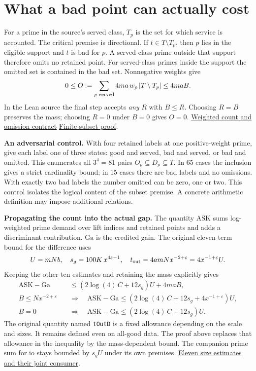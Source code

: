 \documentclass[12pt,letterpaper]{article}
\newcommand{\orig}[3]{\href{https://github.com/nousentllc/riemann-hypothesis/blob/40e56bab026552e089d7afcfeff08d2defb9c005/src/#1.lean\#L#2}{#3}}
\newcommand{\para}[1]{\par\medskip\noindent\textbf{#1}\quad}
\newcommand{\pagepart}[1]{\clearpage\section{#1}}
\newcommand{\ASK}{\mathrm{ASK}}\newcommand{\Ga}{\mathrm{Ga}}
\newcommand{\sg}{s_g}\newcommand{\floorc}{2\log(4)\,C}
\begin{document}
\pagepart{What a bad point can actually cost}
For a prime in the source's served class, \(T_p\) is the set for which service is accounted. The critical premise is directional. If \(t\in T\setminus T_p\), then \(p\) lies in the eligible support and \(t\) is bad for \(p\). A served-class prime outside that support therefore omits no retained point. For served-class primes inside the support the omitted set is contained in the bad set. Nonnegative weights give
\[
 0\le O:=\sum_{p\ {\rm served}}4ma\,w_p\,|T\setminus T_p|
       \le 4ma B .
\]
In the Lean source the final step accepts \emph{any} \(R\) with \(B\le R\). Choosing \(R=B\) preserves the mass; choosing \(R=0\) under \(B=0\) gives \(O=0\).
\orig{Formalism/SizeWindowBrackets/PrimeClassLossHypothesesSatisfiable}{39}{Weighted count and omission contract}\quad
\orig{Formalism/SizeWindowBrackets/ChainSlopeWindows/DiscriminantSettingSatisfied}{32}{Finite-subset proof}.

\para{An adversarial control.} With four retained labels at one positive-weight prime, give each label one of three states: good and served, bad and served, or bad and omitted. This enumerates all \(3^4=81\) pairs \(O_p\subseteq D_p\subseteq T\). In 65 cases the inclusion gives a strict cardinality bound; in 15 cases there are bad labels and no omissions. With exactly two bad labels the number omitted can be zero, one or two. This control isolates the logical content of the subset premise. A concrete arithmetic definition may impose additional relations.

\para{Propagating the count into the actual gap.} The quantity \(\ASK\) sums log-weighted prime demand over lift indices and retained points and adds a discriminant contribution. \(\Ga\) is the credited gain. The original eleven-term bound for the difference uses
\[
 U=mNb,\quad \sg=100K\,x^{4\varepsilon-1},\quad
 t_{\rm out}=4amN x^{-2+\varepsilon}=4x^{-1+\varepsilon}U .
\]
Keeping the other ten estimates and retaining the mass explicitly gives
\begin{align*}
 \ASK-\Ga &\le (\floorc+12\sg)U +4maB,\\
 B\le Nx^{-2+\varepsilon}\quad&\Longrightarrow\quad
 \ASK-\Ga \le (\floorc+12\sg+4x^{-1+\varepsilon})U,\\
 B=0\quad&\Longrightarrow\quad\ASK-\Ga\le(\floorc+12\sg)U .
\end{align*}
The original quantity named \texttt{tOutD} is a fixed allowance depending on the scale and sizes. It remains defined even on all-good data. The proof above replaces that allowance in the inequality by the mass-dependent bound. The companion prime sum for \(\mathrm{io}\) stays bounded by \(\sg U\) under its own premises.
\orig{Formalism/SizeWindowBrackets/ChainSlopeWindows/DiscriminantSettingSatisfied}{162}{Eleven size estimates and their joint consumer}.
\end{document}
